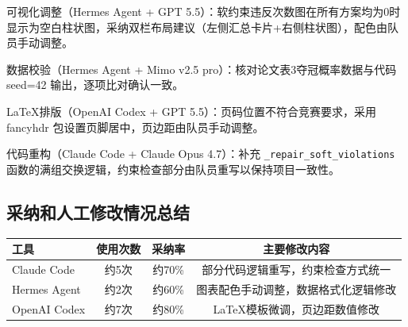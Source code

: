 \documentclass[a4paper,12pt]{article}
\begin{document}
可视化调整（Hermes Agent + GPT 5.5）：软约束违反次数图在所有方案均为0时显示为空白柱状图，采纳双栏布局建议（左侧汇总卡片+右侧柱状图），配色由队员手动调整。

数据校验（Hermes Agent + Mimo v2.5 pro）：核对论文表3夺冠概率数据与代码 seed=42 输出，逐项比对确认一致。

LaTeX排版（OpenAI Codex + GPT 5.5）：页码位置不符合竞赛要求，采用 fancyhdr 包设置页脚居中，页边距由队员手动调整。

代码重构（Claude Code + Claude Opus 4.7）：补充 \texttt{\_repair\_soft\_violations} 函数的满组交换逻辑，约束检查部分由队员重写以保持项目一致性。

\subsection{采纳和人工修改情况总结}

\begin{table}[H]
\centering
\begin{tabular}{lccc}
\toprule
工具 & 使用次数 & 采纳率 & 主要修改内容 \\
\midrule
Claude Code & 约5次 & 约70\% & 部分代码逻辑重写，约束检查方式统一 \\
Hermes Agent & 约2次 & 约60\% & 图表配色手动调整，数据格式化逻辑修改 \\
OpenAI Codex & 约7次 & 约80\% & LaTeX模板微调，页边距数值修改 \\
\bottomrule
\end{tabular}
\end{table}
\end{document}

